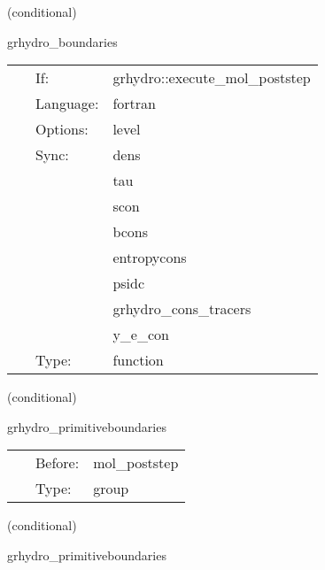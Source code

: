 \vspace{5mm}

   (conditional) 

\hspace{5mm} grhydro\_boundaries 

\hspace{5mm}{\it select grhydro boundary conditions } 


\hspace{5mm}

 \begin{tabular*}{160mm}{cll} 
~ & If:  & grhydro::execute\_mol\_poststep \\ 
~ & Language:  & fortran \\ 
~ & Options:  & level \\ 
~ & Sync:  & dens \\ 
~& ~ &tau\\ 
~& ~ &scon\\ 
~& ~ &bcons\\ 
~& ~ &entropycons\\ 
~& ~ &psidc\\ 
~& ~ &grhydro\_cons\_tracers\\ 
~& ~ &y\_e\_con\\ 
~ & Type:  & function \\ 
\end{tabular*} 


\vspace{5mm}

   (conditional) 

\hspace{5mm} grhydro\_primitiveboundaries 

\hspace{5mm}{\it apply boundary conditions to all primitives } 


\hspace{5mm}

 \begin{tabular*}{160mm}{cll} 
~ & Before:  & mol\_poststep \\ 
~ & Type:  & group \\ 
\end{tabular*} 


\vspace{5mm}

   (conditional) 

\hspace{5mm} grhydro\_primitiveboundaries 

